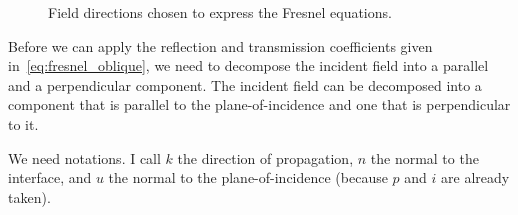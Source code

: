 %

\begin{figure}[hbtp]
    \centering
    \caption{\label{fig:fresnel_directions}Field directions chosen to express the Fresnel equations.}
\end{figure}

Before we can apply the reflection and transmission coefficients given in~\eqref{eq:fresnel_oblique}, we need to decompose the incident field into a parallel and a perpendicular component.
The incident field can be decomposed into a component that is parallel to the plane-of-incidence and one that is perpendicular to it.

We need notations.
I call $k$ the direction of propagation, $n$ the normal to the interface, and $u$ the normal to the plane-of-incidence (because $p$ and $i$ are already taken).

